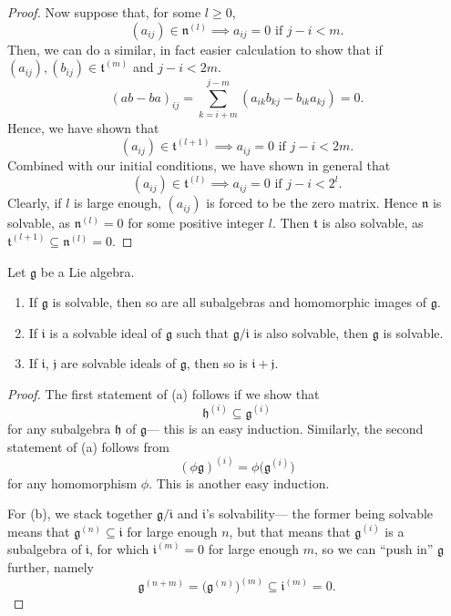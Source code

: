 \documentclass{article}
\newcommand*\frkg{{\ensuremath{\mathfrak{g}}}}
\newcommand*\frkh{{\ensuremath{\mathfrak{h}}}}
\newcommand*\frki{{\ensuremath{\mathfrak{i}}}}
\newcommand*\frkj{{\ensuremath{\mathfrak{j}}}}
\newcommand*\talg{\ensuremath{\mathfrak{t}}}
\newcommand*\nalg{\ensuremath{\mathfrak{n}}}
\begin{document}
\begin{proof}
    Now suppose that, for some $l \geq 0$,
    \[
        (a_{ij}) \in \nalg^{(l)} 
        \implies
        a_{ij} = 0 \text{ if } j - i < m.
    \]
    Then, we can do a similar, in fact easier calculation to show that if $(a_{ij}), (b_{ij}) \in \talg^{(m)}$ and $j-i < 2m$.
    \[
        (ab - ba)_{ij}
        =
        \sum_{k=i+m}^{j-m}
        (a_{ik}b_{kj}-b_{ik}a_{kj})
        =
        0.
    \]
    Hence, we have shown that
    \[
        (a_{ij}) \in \talg^{(l+1)} 
        \implies
        a_{ij} = 0 \text{ if } j - i < 2m.
    \]
    Combined with our initial conditions, we have shown in general that
    \[
        (a_{ij}) \in \talg^{(l)} 
        \implies
        a_{ij} = 0 \text{ if } j - i < 2^l.
    \]
    Clearly, if $l$ is large enough, $(a_{ij})$ is forced to be the zero matrix.
    Hence $\nalg$ is solvable, as $\nalg^{(l)} = 0$ for some positive integer $l$.
    Then $\talg$ is also solvable, as $\talg^{(l+1)} \subseteq \nalg^{(l)} = 0$.
\end{proof}

\begin{theorem}
    \label{thm:SolvabilityStructuralResults}
    Let $\frkg$ be a Lie algebra.
    \begin{enumerate}[label=(\alph*)]
        \item 
            If $\frkg$ is solvable, then so are all subalgebras and homomorphic images of $\frkg$.
        \item 
            If $\frki$ is a solvable ideal of $\frkg$ such that $\frkg/\frki$ is also solvable, then $\frkg$ is solvable.
        \item 
            If $\frki$, $\frkj$ are solvable ideals of $\frkg$, then so is $\frki + \frkj$.
    \end{enumerate}
\end{theorem}

\begin{proof}
    The first statement of (a) follows if we show that
    \[
        \frkh^{(i)} \subseteq \frkg^{(i)}
    \]
    for any subalgebra $\frkh$ of $\frkg$--- this is an easy induction.
    Similarly, the second statement of (a) follows from
    \[
        (\phi\frkg)^{(i)} 
        = 
        \phi\Big(\frkg^{(i)}\Big)
    \]
    for any homomorphism $\phi$.
    This is another easy induction.

    For (b), we stack together $\frkg/\frki$ and $\frki$'s solvability--- the former being solvable means that $\frkg^{(n)} \subseteq \frki$ for large enough $n$, but that means that $\frkg^{(i)}$ is a subalgebra of $\frki$, for which $\frki^{(m)} = 0$ for large enough $m$, so we can ``push in'' $\frkg$ further, namely
    \[
        \frkg^{(n+m)}
        =
        \Big(\frkg^{(n)}\Big)^{(m)}
        \subseteq
        \frki^{(m)}
        =
        0.
    \]
\end{proof}
\end{document}

